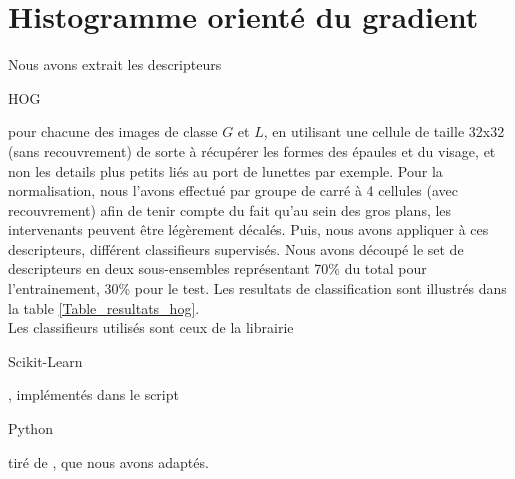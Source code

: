\documentclass{book}
\begin{document}
\section{Histogramme orienté du gradient}
Nous avons extrait les descripteurs \begin{itshape}HOG\end{itshape} pour chacune des images de classe $G$ et $L$, en utilisant 
une cellule de taille 32x32 (sans recouvrement) de sorte à récupérer les formes des épaules et du visage, et non les details 
plus petits liés au port de lunettes par exemple. Pour la normalisation, nous l'avons effectué par groupe de carré à 4 cellules (avec
recouvrement) afin de tenir compte du fait qu'au sein des gros plans, les intervenants peuvent être légèrement décalés.
Puis, nous avons appliquer à ces descripteurs, différent classifieurs supervisés. 
Nous avons découpé le set de descripteurs en deux sous-ensembles représentant 70\% du total pour l'entrainement, 
30\% pour le test. Les resultats de classification sont illustrés dans la table \ref{Table_resultats_hog}.\\
Les classifieurs utilisés sont ceux de la librairie \begin{itshape}Scikit-Learn\end{itshape}, implémentés dans le script 
\begin{itshape}Python\end{itshape} tiré de \cite{scikit_bench}, que nous avons adaptés.
\end{document}
